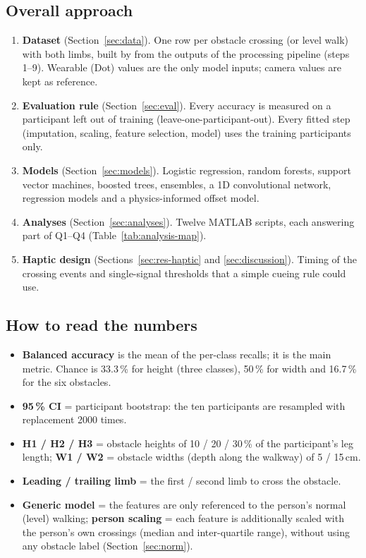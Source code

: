 \subsection{Overall approach}

\begin{enumerate}[leftmargin=*]
  \item \textbf{Dataset} (Section~\ref{sec:data}). One row per obstacle crossing (or level walk) with both limbs, built by
   from the outputs of the processing pipeline (steps 1--9). Wearable (Dot) values
  are the only model inputs; camera values are kept as reference.
  \item \textbf{Evaluation rule} (Section~\ref{sec:eval}). Every accuracy is measured on a participant left out of training
  (leave-one-participant-out). Every fitted step (imputation, scaling, feature selection, model) uses the training
  participants only.
  \item \textbf{Models} (Section~\ref{sec:models}). Logistic regression, random forests, support vector machines, boosted
  trees, ensembles, a 1D convolutional network, regression models and a physics-informed offset model.
  \item \textbf{Analyses} (Section~\ref{sec:analyses}). Twelve MATLAB scripts, each answering part of Q1--Q4
  (Table~\ref{tab:analysis-map}).
  \item \textbf{Haptic design} (Sections~\ref{sec:res-haptic} and \ref{sec:discussion}). Timing of the crossing events
  and single-signal thresholds that a simple cueing rule could use.
\end{enumerate}

\subsection{How to read the numbers}

\begin{itemize}
  \item \textbf{Balanced accuracy} is the mean of the per-class recalls; it is the main metric. Chance is
  33.3\,\% for height (three classes), 50\,\% for width and 16.7\,\% for the six obstacles.
  \item \textbf{95\,\% CI} = participant bootstrap: the ten participants are resampled with replacement 2000 times.
  \item \textbf{H1 / H2 / H3} = obstacle heights of 10 / 20 / 30\,\% of the participant's leg length;
  \textbf{W1 / W2} = obstacle widths (depth along the walkway) of 5 / 15\,cm.
  \item \textbf{Leading / trailing limb} = the first / second limb to cross the obstacle.
  \item \textbf{Generic model} = the features are only referenced to the person's normal (level) walking;
  \textbf{person scaling} = each feature is additionally scaled with the person's own crossings (median and
  inter-quartile range), without using any obstacle label (Section~\ref{sec:norm}).
\end{itemize}
